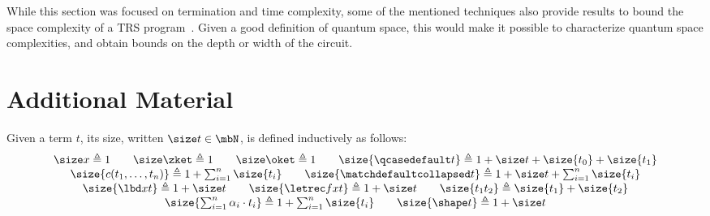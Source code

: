 While this section was focused on termination and time complexity, some of the
mentioned techniques also provide results to bound the space complexity of a
TRS program~\cite{BMM11}. Given a good definition of quantum space, this would
make it possible to characterize quantum space complexities, and obtain bounds
on the depth or width of the circuit.



\appendix

\section{Additional Material}
\label{app:additional}

\begin{definition}
  \label{def:size}
  Given a term $t$, its size, written $\size t \in \mbN$, is defined
  inductively as follows:
  \begingroup
  \renewcommand{\arraystretch}{1.5}
  \[
    \begin{array}{c}
      \size x \triangleq 1
      \qquad
      \size \zket \triangleq 1
      \qquad
      \size \oket \triangleq 1
      \qquad
      \size{\qcasedefault t} \triangleq 1 + \size t + \size{t_0} + \size{t_1} \\
      \size{c(t_1, \dots, t_n)} \triangleq 1 + \sum_{i=1}^n \size{t_i}
      \qquad
      \size{\matchdefaultcollapsed t} \triangleq 1 + \size t +
      \sum_{i=1}^n \size{t_i} \\
      \size{\lbd x t} \triangleq 1 + \size t
      \qquad
      \size{\letrec f x t} \triangleq 1 + \size t
      \qquad
      \size{t_1t_2} \triangleq \size{t_1} + \size{t_2}
      \\
      \size{\sum_{i=1}^n \alpha_i \cdot t_i} \triangleq 1 + \sum_{i=1}^n \size{t_i}
      \qquad
      \size{\shape t} \triangleq 1 + \size t
    \end{array}
  \]
  \endgroup
\end{definition}

